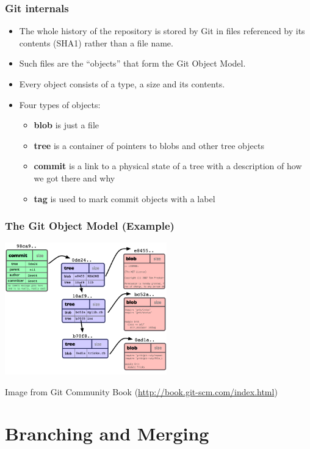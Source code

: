 \begin{frame}
  \frametitle{Git internals}

  \begin{itemize}
  \item The whole history of the repository is stored by Git in files
    referenced by its contents (SHA1) rather than a file name. 
  \item Such files are the ``objects'' that form the Git Object Model.
  \item Every object consists of a type, a size and its contents.
  \item Four types of objects:
    \begin{itemize}
    \item {\bf blob} is just a file
    \item {\bf tree} is a container of pointers to blobs and other
      tree objects
    \item {\bf commit} is a link to a physical state of a tree with a
      description of how we got there and why
    \item {\bf tag} is used to mark commit objects with a label
    \end{itemize}
  \end{itemize}
\end{frame}

\begin{frame}
  \frametitle{The Git Object Model (Example)}
  \begin{center}
    \includegraphics[width=7cm]{figs/objects-example.png}
  \end{center}

{\Tiny
Image from Git Community Book
(\url{http://book.git-scm.com/index.html})
}
\end{frame}

\section{Branching and Merging}

